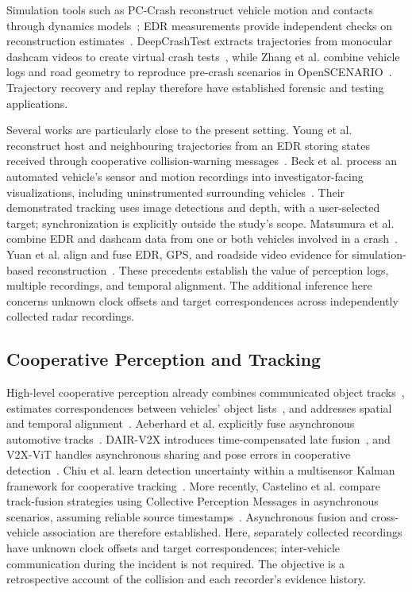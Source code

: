 Simulation tools such as PC-Crash reconstruct vehicle motion and contacts
through dynamics models~\cite{steffan1996pccrash}; EDR measurements provide
independent checks on reconstruction estimates~\cite{gabler2004edr}.
DeepCrashTest extracts trajectories from monocular dashcam videos to create
virtual crash tests~\cite{bashetty2020deepcrashtest}, while Zhang et al.
combine vehicle logs and road geometry to reproduce pre-crash scenarios
in OpenSCENARIO~\cite{zhang2025reverse}. Trajectory recovery and replay
therefore have established forensic and testing applications.

Several works are particularly close to the present setting. Young et al.
reconstruct host and neighbouring trajectories from an EDR storing states
received through cooperative collision-warning
messages~\cite{young2009reconstruction}. Beck et al. process an automated
vehicle's sensor and motion recordings into investigator-facing
visualizations, including uninstrumented surrounding
vehicles~\cite{beck2023pipeline}. Their demonstrated tracking uses image
detections and depth, with a user-selected target; synchronization is
explicitly outside the study's scope. Matsumura et al. combine EDR and dashcam
data from one or both vehicles involved in a crash~\cite{matsumura2024precrash}.
Yuan et al. align and fuse EDR, GPS, and roadside video evidence for
simulation-based reconstruction~\cite{yuan2026multisource}.
These precedents establish the value of perception logs, multiple recordings,
and temporal alignment. The additional inference here concerns unknown
clock offsets and target correspondences across independently collected
radar recordings.

\subsection{Cooperative Perception and Tracking}

High-level cooperative perception already combines communicated object
tracks~\cite{rauch2012car2x}, estimates correspondences between vehicles'
object lists~\cite{rauch2013association}, and addresses spatial and temporal
alignment~\cite{allig2019alignment}. Aeberhard et al. explicitly fuse
asynchronous automotive tracks~\cite{aeberhard2012asynchronous}.
DAIR-V2X introduces time-compensated late fusion~\cite{yu2022dairv2x},
and V2X-ViT handles asynchronous sharing and pose errors in cooperative
detection~\cite{xu2022v2xvit}. Chiu et al. learn detection uncertainty within
a multisensor Kalman framework for cooperative tracking~\cite{chiu2024dmstrack}.
More recently, Castelino et al. compare track-fusion strategies using
Collective Perception Messages in asynchronous scenarios, assuming reliable
source timestamps~\cite{castelino2026fusion}.
Asynchronous fusion and cross-vehicle association are therefore established.
Here, separately collected recordings have unknown clock offsets and target
correspondences; inter-vehicle communication during the incident is not
required. The objective is a retrospective account of the collision and
each recorder's evidence history.

